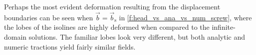 \documentclass[11pt]{iopart}
\begin{document}
Perhaps the most evident deformation resulting from the displacement boundaries can be seen when $\vec{b} = \vec{b}_{\textrm{s}}$ in \cref{f:head_vs_ana_vs_num_screw}, where the lobes of the isolines are highly deformed when compared to the infinite-domain solutions. The familiar lobes look very different, but both analytic and numeric tractions yield fairly similar fields.
\begin{figure}
    \centering
    ~
    ~
    ~


\end{figure}
\end{document}
